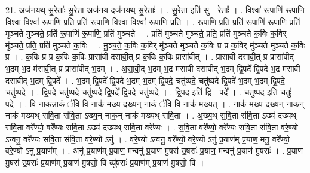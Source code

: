 \documentclass[17pt]{extarticle}
\begin{document}
21. अज॑नयथ् सु॒रेताः᳚ सु॒रेता॒ अज॑नय॒ दज॑नयथ् सु॒रेताः᳚ । . सु॒रेता॒ इति॑ सु - रेताः᳚ । . विश्वा॑ रू॒पाणि॑ रू॒पाणि॒ विश्वा॒ विश्वा॑ रू॒पाणि॒ प्रति॒ प्रति॑ रू॒पाणि॒ विश्वा॒ विश्वा॑ रू॒पाणि॒ प्रति॑ । . रू॒पाणि॒ प्रति॒ प्रति॑ रू॒पाणि॑ रू॒पाणि॒ प्रति॑ मुञ्चते मुञ्चते॒ प्रति॑ रू॒पाणि॑ रू॒पाणि॒ प्रति॑ मुञ्चते । . प्रति॑ मुञ्चते मुञ्चते॒ प्रति॒ प्रति॑ मुञ्चते क॒विः क॒विर् मु॑ञ्चते॒ प्रति॒ प्रति॑ मुञ्चते क॒विः । . मु॒ञ्च॒ते॒ क॒विः क॒विर् मु॑ञ्चते मुञ्चते क॒विः प्र प्र क॒विर् मु॑ञ्चते मुञ्चते क॒विः प्र । . क॒विः प्र प्र क॒विः क॒विः प्रासा॑वी दसावी॒त् प्र क॒विः क॒विः प्रासा॑वीत् । . प्रासा॑वी दसावी॒त् प्र प्रासा॑वीद् भ॒द्रम् भ॒द्र म॑सावी॒त् प्र प्रासा॑वीद् भ॒द्रम् । . अ॒सा॒वी॒द् भ॒द्रम् भ॒द्र म॑सावी दसावीद् भ॒द्रम् द्वि॒पदे᳚ द्वि॒पदे॑ भ॒द्र म॑सावी दसावीद् भ॒द्रम् द्वि॒पदे᳚ । . भ॒द्रम् द्वि॒पदे᳚ द्वि॒पदे॑ भ॒द्रम् भ॒द्रम् द्वि॒पदे॒ चतु॑ष्पदे॒ चतु॑ष्पदे द्वि॒पदे॑ भ॒द्रम् भ॒द्रम् द्वि॒पदे॒ चतु॑ष्पदे । . द्वि॒पदे॒ चतु॑ष्पदे॒ चतु॑ष्पदे द्वि॒पदे᳚ द्वि॒पदे॒ चतु॑ष्पदे । . द्वि॒पद॒ इति॑ द्वि - पदे᳚ । . चतु॑ष्पद॒ इति॒ चतुः॑ - प॒दे॒ । . वि नाक॒न्नाकं॒ ॅवि वि नाक॑ मख्य दख्य॒न् नाकं॒ ॅवि वि नाक॑ मख्यत् । . नाक॑ मख्य दख्य॒न् नाक॒न् नाक॑ मख्यथ् सवि॒ता स॑वि॒ता ऽख्य॒न् नाक॒न् नाक॑ मख्यथ् सवि॒ता । . अ॒ख्य॒थ् स॒वि॒ता स॑वि॒ता ऽख्य॑ दख्यथ् सवि॒ता वरे᳚ण्यो॒ वरे᳚ण्यः सवि॒ता ऽख्य॑ दख्यथ् सवि॒ता वरे᳚ण्यः । . स॒वि॒ता वरे᳚ण्यो॒ वरे᳚ण्यः सवि॒ता स॑वि॒ता वरे॒ण्यो ऽन्वनु॒ वरे᳚ण्यः सवि॒ता स॑वि॒ता वरे॒ण्यो ऽनु॑ । . वरे॒ण्यो ऽन्वनु॒ वरे᳚ण्यो॒ वरे॒ण्यो ऽनु॑ प्र॒याण॑म् प्र॒याण॒ मनु॒ वरे᳚ण्यो॒ वरे॒ण्यो ऽनु॑ प्र॒याण᳚म् । . अनु॑ प्र॒याण॑म् प्र॒याण॒ मन्वनु॑ प्र॒याण॑ मु॒षस॑ उ॒षसः॑ प्र॒याण॒ मन्वनु॑ प्र॒याण॑ मु॒षसः॑ । . प्र॒याण॑ मु॒षस॑ उ॒षसः॑ प्र॒याण॑म् प्र॒याण॑ मु॒षसो॒ वि व्यु॑षसः॑ प्र॒याण॑म् प्र॒याण॑ मु॒षसो॒ वि । \newline
\end{document}
